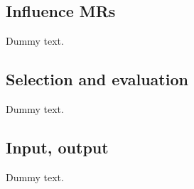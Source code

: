 \subsection{Influence \aclp{MR}}

Dummy text.

\subsection{Selection and evaluation}

Dummy text.

\subsection{Input, output}

Dummy text.

